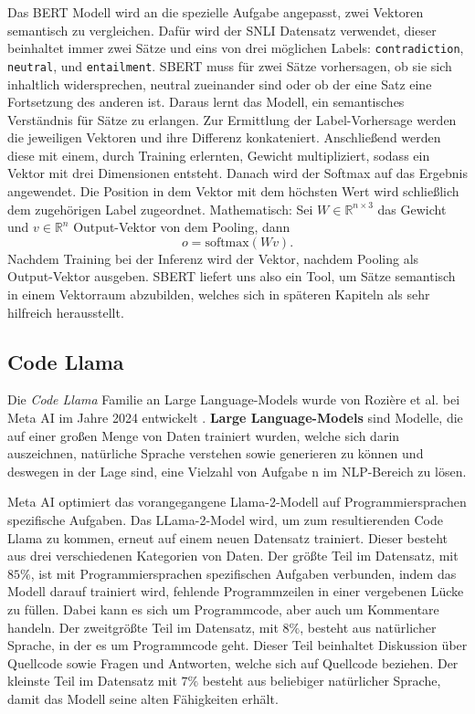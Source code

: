 \documentclass[12pt,letterpaper,ngerman]{article}
\begin{document}
Das BERT Modell wird an die spezielle Aufgabe 
angepasst, zwei Vektoren semantisch zu vergleichen. 
Dafür wird der SNLI Datensatz verwendet, dieser beinhaltet immer 
zwei Sätze und eins von drei möglichen Labels: 
\verb|contradiction|, \verb|neutral|, und \verb|entailment|.
SBERT muss für zwei Sätze vorhersagen, ob sie sich inhaltlich widersprechen,
neutral zueinander sind oder ob der eine Satz eine Fortsetzung des 
anderen ist. Daraus lernt das Modell, ein semantisches Verständnis 
für Sätze zu erlangen. Zur Ermittlung der Label-Vorhersage werden die 
jeweiligen Vektoren und ihre Differenz konkateniert. Anschließend 
werden diese mit einem, durch Training erlernten, Gewicht multipliziert,
sodass ein 
Vektor mit drei Dimensionen entsteht. Danach wird der Softmax auf das
Ergebnis angewendet. Die Position in dem Vektor mit dem höchsten Wert 
wird schließlich dem zugehörigen Label zugeordnet. Mathematisch:
Sei $W \in \mathbb{R}^{n\times 3}$ das Gewicht und 
$v \in \mathbb{R}^n$ Output-Vektor von dem Pooling, dann
\[
  o = \text{softmax}(Wv).
\]
Nachdem Training bei der Inferenz wird der Vektor, nachdem Pooling 
als Output-Vektor ausgeben. SBERT liefert uns also ein Tool, 
um Sätze semantisch in einem Vektorraum abzubilden,
welches sich in späteren Kapiteln als sehr hilfreich herausstellt.
\pagebreak
\subsection{Code Llama}
Die \textit{Code Llama} Familie an Large Language-Models wurde von 
Rozière et al. bei Meta AI im Jahre 2024 entwickelt
\cite{rozière2024codellamaopenfoundation}.
{\bf Large Language-Models} sind Modelle, die auf
einer großen Menge von Daten trainiert wurden, welche sich darin
auszeichnen, natürliche Sprache verstehen sowie generieren zu
können und deswegen in der Lage sind, eine Vielzahl von Aufgabe
n im NLP-Bereich zu lösen.

Meta AI optimiert das vorangegangene Llama-2-Modell auf
Programmiersprachen spezifische Aufgaben. Das LLama-2-Model wird,
um zum resultierenden Code Llama zu kommen, erneut auf einem neuen
Datensatz trainiert. Dieser besteht aus drei verschiedenen 
Kategorien von Daten. Der größte Teil im Datensatz, mit $85 \%$,
ist mit Programmiersprachen spezifischen Aufgaben verbunden,
indem das Modell darauf trainiert wird, fehlende Programmzeilen in 
einer vergebenen Lücke zu füllen. Dabei kann es sich um Programmcode,
aber auch um Kommentare handeln. Der zweitgrößte Teil im Datensatz,
mit $8 \%$, besteht aus natürlicher Sprache, in der es um 
Programmcode geht. Dieser Teil beinhaltet Diskussion über Quellcode
sowie Fragen und Antworten, welche sich auf Quellcode beziehen. 
Der kleinste Teil im Datensatz mit $7 \%$ besteht aus beliebiger 
natürlicher Sprache, damit das Modell seine alten Fähigkeiten erhält. 
\end{document}
